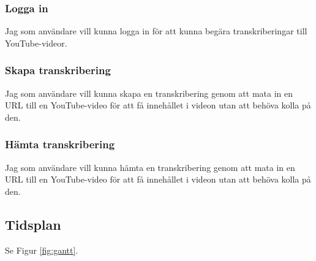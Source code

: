 \subsubsection{Logga in}
Jag som användare vill kunna logga in för att kunna begära transkriberingar
till YouTube-videor.

\subsubsection{Skapa transkribering}
Jag som användare vill kunna skapa en transkribering genom att mata in en URL
till en YouTube-video för att få innehållet i videon utan att behöva kolla på
den.

\subsubsection{Hämta transkribering}
Jag som användare vill kunna hämta en transkribering genom att mata in en URL
till en YouTube-video för att få innehållet i videon utan att behöva kolla på
den.

\subsection{Tidsplan}
Se Figur \ref{fig:gantt}.